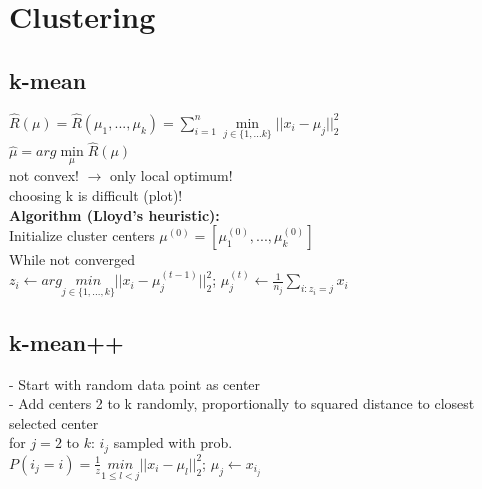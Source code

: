 \section*{Clustering}
\subsection*{k-mean}
$\hat{R}(\mu) = \hat{R}(\mu_1,...,\mu_k) = \sum_{i=1}^n \underset{j\in\{1,...k\}}{\operatorname{min}}||x_i-\mu_j||_2^2$\\
$\hat{\mu} = arg \underset{\mu}{\operatorname{min}}\hat{R}(\mu)$\\
not convex! $\rightarrow$ only local optimum!\\
choosing k is difficult (plot)!\\
\textbf{Algorithm (Lloyd's heuristic):}\\
Initialize cluster centers $\mu^{(0)} = [\mu_1^{(0)},...,\mu_k^{(0)}]$\\
While not converged\\
$z_i \leftarrow arg \underset{j\in\{1,...,k\}}{min}||x_i - \mu_j^{(t-1)}||_2^2$; $\mu_j^{(t)} \leftarrow \frac{1}{n_j}\sum_{i:z_i=j}x_i$

\subsection*{k-mean++}
- Start with random data point as center\\
- Add centers 2 to k randomly, proportionally to squared distance to closest selected center\\
for $j=2$ to $k$:
$i_j$ sampled with prob.\\
$P(i_j=i) = \frac{1}{z} \underset{1\leq l<j}{min}||x_i-\mu_l||_2^2$; $\mu_j \leftarrow x_{i_j}$